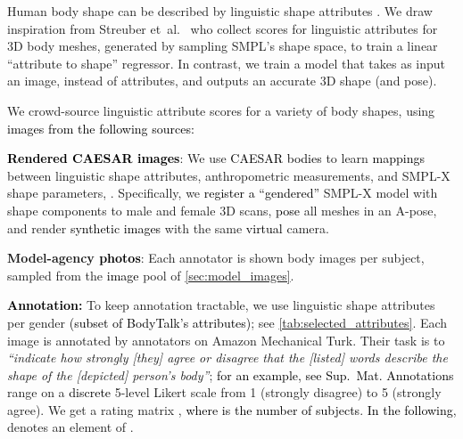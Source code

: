 \documentclass[10pt,twocolumn,letterpaper]{article}
\newcommand{\qheading}[1]{\noindent\textbf{#1}:}
\newcommand{\zheading}[1]{\textbf{#1:}}
\newcommand{\apose}{\mbox{A-pose}\xspace}
\newcommand{\threeD}{3D\xspace}
\newcommand{\bodytalk}{\mbox{BodyTalk}\xspace}
\newcommand{\smplx}{\mbox{SMPL-X}\xspace}
\newcommand{\smplX}{\smplx}
\newcommand{\smpl}{\mbox{SMPL}\xspace}
\newcommand{\caesar}{\mbox{CAESAR}\xspace}
\newcommand{\supmat}{{\mbox{\textcolor{black}{Sup.~Mat.}}}\xspace}
\renewcommand{\etal}{\mbox{et al.}\xspace}
\newcommand{\cameraready}[1]{\textcolor{Fuchsia}{{#1}}\xspace}
\renewcommand{\cameraready}[1]{\textcolor{black}{{#1}}\xspace}
\newcommand{\colorTERM}{blue}
\renewcommand{\colorTERM}{black}
\newcommand{\measurements}[0]{{\color{\colorTERM}anthropometric measurements}\xspace}
\newcommand{\linguisticattributes}[0]{{\color{\colorTERM}linguistic attributes}\xspace}
\newcommand{\linguisticshapeattributes}[0]{{\color{\colorTERM}linguistic shape attributes}\xspace}
\newcommand{\scores}[0]{{scores}\xspace}
\newcommand{\linguisticattributescores}[0]{{\color{\colorTERM}linguistic attribute \scores}\xspace}
\begin{document}
Human body shape can be described by 
\linguisticshapeattributes 
\cite{hill2015exploring}. 
We draw inspiration from Streuber \etal~\cite{Streuber:SIGGRAPH:2016} who collect \scores for  \linguisticattributes for  \threeD body meshes, generated by sampling \smpl's shape space, to train a linear ``attribute to shape'' regressor. 
In contrast, we train a model that takes as input an image, instead of attributes, and outputs an accurate \threeD shape (and pose). 

We crowd-source \linguisticattributescores for a variety of body shapes, using 
\cameraready{images from the following sources:}

\qheading{\cameraready{Rendered \caesar images}}  \label{sec:caesar_data} 
We use \cameraready{\caesar \cite{CAESAR} bodies} 
to learn \cameraready{mappings} between \linguisticshapeattributes, 
\measurements, 
and \smplX shape parameters, .
Specifically, we 
\cameraready{register a ``gendered''} 
\smplx model with  shape components
to  male and  female \threeD scans,
\cameraready{pose}
all meshes in an \apose, and render \cameraready{synthetic images} with the same 
\cameraready{virtual} camera.

\qheading{Model-agency \cameraready{photos}}
Each annotator is shown  body images per subject, sampled from the \cameraready{image} pool of \cref{sec:model_images}.

\zheading{\cameraready{Annotation}} To keep annotation tractable, 
we use  \linguisticshapeattributes per gender \cameraready{(subset of \cameraready{\bodytalk's} \cite{Streuber:SIGGRAPH:2016} attributes)}; see  \cref{tab:selected_attributes}.
Each image is annotated by  annotators on Amazon Mechanical Turk. Their task is to \emph{``indicate how strongly [they] agree or disagree that the [listed] words describe the shape of the [depicted] person's body''}; 
\cameraready{for an example, see \supmat} 
\cameraready{Annotations} 
range on a \cameraready{discrete} 5-level Likert scale from 1 (strongly disagree) to 5 (strongly agree). 
We get a rating matrix ,
\cameraready{where  is the number of subjects}. 
\cameraready{In the following},  denotes an element of . 
\end{document}
